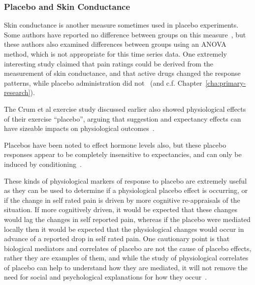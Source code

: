 

\subsubsection{Placebo and Skin Conductance}
\label{sec:plac-skin-cond}



Skin conductance is another measure sometimes used in placebo experiments. Some authors have reported no difference between groups on this measure~\cite{Flaten1999}, but these authors also examined differences between groups using an ANOVA method, which is not appropriate for this time series data. One extremely interesting study claimed that pain ratings could be derived from the measurement of skin conductance, and that active drugs changed the response patterns, while placebo administration did not~\cite{Fujita2000} (and c.f. Chapter~\ref{cha:primary-research}).

The Crum et al exercise study discussed earlier also showed physiological effects of their exercise ``placebo'', arguing that suggestion and expectancy effects can have sizeable impacts on physiological outcomes~\cite{Crum2007}.

Placebos have been noted to effect hormone levels also, but these placebo responses appear to be completely insensitive to expectancies, and can only be induced by conditioning~\cite{benedetti2003a}. 

These kinds of physiological markers of response to placebo are extremely useful as they can be used to determine if a physiological placebo effect is occurring, or if the change in self rated pain is driven by more cognitive re-appraisals of the situation. If more cognitively driven, it would be expected that these changes would lag the changes in self reported pain, whereas if the placebo were mediated locally then it would be expected that the physiological changes would occur in advance of a reported drop in self rated pain. One cautionary point is that biological mediators and correlates of placebo are not the cause of placebo effects, rather they are examples of them, and while the study of physiological correlates of placebo can help to understand how they are mediated, it will not remove the need for social and psychological explanations for how they occur~\cite{Stewart-Williams2004b}. 



